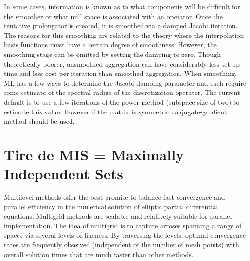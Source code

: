 In some cases, information is known as to what components will be difficult
for the smoother or what null space is associated with an operator. Once the
tentative prolongator is created, it is smoothed via a damped Jacobi
iteration. The reasons for this smoothing are related to the theory where the
interpolation basis functions must have a certain degree of smoothness.
However, the smoothing stage can be omitted by setting the damping to zero.
Though theoretically poorer, unsmoothed aggregation can have considerably less
set up time and less cost per iteration than smoothed aggregation. When
smoothing, ML has a few ways to determine the Jacobi damping parameter and
each require some estimate of the spectral radius of the discretization
operator. The current default is to use a few iterations of the power method
(subspace size of two) to estimate this value. However if the matrix is
symmetric conjugate-gradient method should be used.

\section{Tire de \cite{mis} MIS = Maximally Independent Sets}
Multilevel methods offer the best promise to balance fast convergence and
parallel efficiency in the numerical solution of elliptic partial differential
equations. Multigrid methods are scalable and relatively suitable for parallel
implementation. The idea of multigrid is to capture arroses spanning a range of
spaces via several levels of fineness. By traversing the levels, optimal
convergence rates are frequently observed (independent of the number of mesh
points) with overall solution times that are much faster than other methods.

